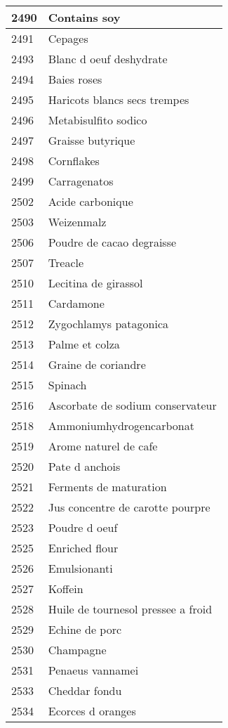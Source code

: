 \begin{longtable}{|l|l|}
2490 & Contains soy \\ \hline 
2491 & Cepages \\ \hline 
2493 & Blanc d oeuf deshydrate \\ \hline 
2494 & Baies roses \\ \hline 
2495 & Haricots blancs secs trempes \\ \hline 
2496 & Metabisulfito sodico \\ \hline 
2497 & Graisse butyrique \\ \hline 
2498 & Cornflakes \\ \hline 
2499 & Carragenatos \\ \hline 
2502 & Acide carbonique \\ \hline 
2503 & Weizenmalz \\ \hline 
2506 & Poudre de cacao degraisse \\ \hline 
2507 & Treacle \\ \hline 
2510 & Lecitina de girassol \\ \hline 
2511 & Cardamone \\ \hline 
2512 & Zygochlamys patagonica \\ \hline 
2513 & Palme et colza \\ \hline 
2514 & Graine de coriandre \\ \hline 
2515 & Spinach \\ \hline 
2516 & Ascorbate de sodium conservateur \\ \hline 
2518 & Ammoniumhydrogencarbonat \\ \hline 
2519 & Arome naturel de cafe \\ \hline 
2520 & Pate d anchois \\ \hline 
2521 & Ferments de maturation \\ \hline 
2522 & Jus concentre de carotte pourpre \\ \hline 
2523 & Poudre d oeuf \\ \hline 
2525 & Enriched flour \\ \hline 
2526 & Emulsionanti \\ \hline 
2527 & Koffein \\ \hline 
2528 & Huile de tournesol pressee a froid \\ \hline 
2529 & Echine de porc \\ \hline 
2530 & Champagne \\ \hline 
2531 & Penaeus vannamei \\ \hline 
2533 & Cheddar fondu \\ \hline 
2534 & Ecorces d oranges \\ \hline 

\end{longtable}
